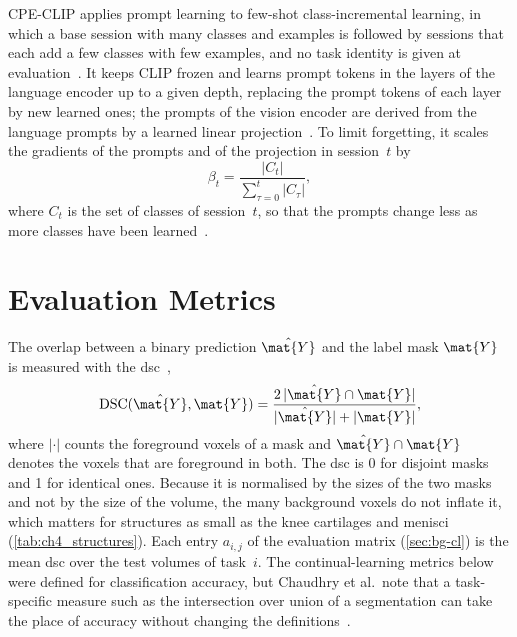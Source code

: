 CPE-CLIP applies prompt learning to few-shot class-incremental learning, in which a base session with many classes and examples is followed by sessions that each add a few classes with few examples, and no task identity is given at evaluation~\cite[Sec.~1, 3]{D_Alessandro_2023}.
It keeps CLIP frozen and learns prompt tokens in the layers of the language encoder up to a given depth, replacing the prompt tokens of each layer by new learned ones; the prompts of the vision encoder are derived from the language prompts by a learned linear projection~\cite[Sec.~4, Eqs.~2--8]{D_Alessandro_2023}.
To limit forgetting, it scales the gradients of the prompts and of the projection in session~$t$ by
\begin{equation}
\beta_t = \frac{|C_t|}{\sum_{\tau=0}^{t} |C_\tau|},
\label{eq:bg-cpe-scaling}
\end{equation}
where $C_t$ is the set of classes of session~$t$, so that the prompts change less as more classes have been learned~\cite[Sec.~4, Eqs.~11--13]{D_Alessandro_2023}.

\section{Evaluation Metrics}
\label{sec:bg-metrics}

The overlap between a binary prediction $\hat{\mat{Y}}$ and the label mask $\mat{Y}$ is measured with the \gls{dsc}~\cite{dice1945measures},
\begin{equation}
\operatorname{DSC}(\hat{\mat{Y}}, \mat{Y}) = \frac{2\,|\hat{\mat{Y}} \cap \mat{Y}|}{|\hat{\mat{Y}}| + |\mat{Y}|},
\label{eq:bg-dsc}
\end{equation}
where $|\cdot|$ counts the foreground voxels of a mask and $\hat{\mat{Y}} \cap \mat{Y}$ denotes the voxels that are foreground in both.
The \gls{dsc} is 0 for disjoint masks and 1 for identical ones.
Because it is normalised by the sizes of the two masks and not by the size of the volume, the many background voxels do not inflate it, which matters for structures as small as the knee cartilages and menisci (\cref{tab:ch4_structures}).
Each entry $a_{i,j}$ of the evaluation matrix (\cref{sec:bg-cl}) is the mean \gls{dsc} over the test volumes of task~$i$.
The continual-learning metrics below were defined for classification accuracy, but Chaudhry et al.\ note that a task-specific measure such as the intersection over union of a segmentation can take the place of accuracy without changing the definitions~\cite[Sec.~3]{Chaudhry_2018}.

